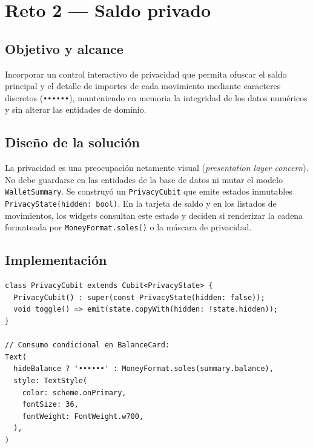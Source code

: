 \documentclass[12pt,a4paper]{article}
\begin{document}
\section{Reto 2 — Saldo privado}

\subsection{Objetivo y alcance}
Incorporar un control interactivo de privacidad que permita ofuscar el saldo principal y el detalle de importes de cada movimiento mediante caracteres discretos (\texttt{••••••}), manteniendo en memoria la integridad de los datos numéricos y sin alterar las entidades de dominio.

\subsection{Diseño de la solución}
La privacidad es una preocupación netamente visual (\textit{presentation layer concern}). No debe guardarse en las entidades de la base de datos ni mutar el modelo \texttt{WalletSummary}. Se construyó un \texttt{PrivacyCubit} que emite estados inmutables \texttt{PrivacyState(hidden: bool)}. En la tarjeta de saldo y en los listados de movimientos, los widgets consultan este estado y deciden si renderizar la cadena formateada por \texttt{MoneyFormat.soles()} o la máscara de privacidad.

\subsection{Implementación}
\begin{lstlisting}[caption={Conmutación de privacidad en PrivacyCubit y renderizado en BalanceCard.}]
class PrivacyCubit extends Cubit<PrivacyState> {
  PrivacyCubit() : super(const PrivacyState(hidden: false));
  void toggle() => emit(state.copyWith(hidden: !state.hidden));
}

// Consumo condicional en BalanceCard:
Text(
  hideBalance ? '••••••' : MoneyFormat.soles(summary.balance),
  style: TextStyle(
    color: scheme.onPrimary,
    fontSize: 36,
    fontWeight: FontWeight.w700,
  ),
)
\end{lstlisting}
\end{document}
